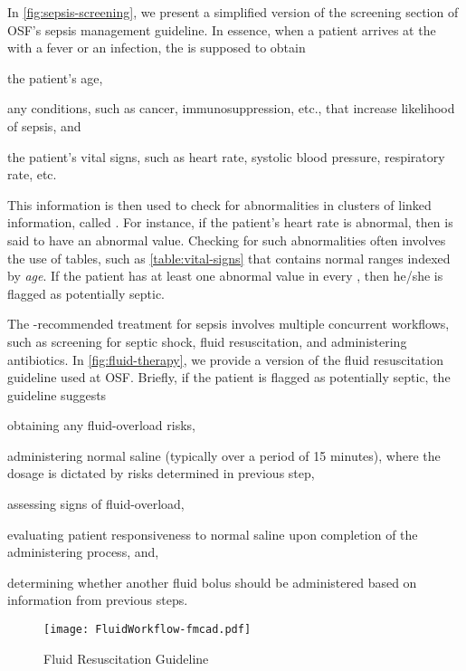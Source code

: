 In \autoref{fig:sepsis-screening}, we present a simplified version of
the screening section of OSF's sepsis management guideline.
In essence, when a patient arrives at the
\ED{} with a fever or an infection, the \HCP{} is supposed to obtain
\begin{enumerate*}[label=(\alph*)]
  \item the patient's age,
  \item any conditions, such as cancer, immunosuppression, etc.,
    that increase likelihood of sepsis, and
  \item the patient's vital signs, such as heart rate, systolic blood
    pressure, respiratory rate, etc.
\end{enumerate*}

This information is then used to check for abnormalities
in clusters of linked information, called . For instance, if
the patient's heart rate is abnormal, then  is said to
have an abnormal value.
Checking for such abnormalities often involves the use of tables, such as
\autoref{table:vital-signs} that contains normal ranges indexed by
\emph{age}.
If the patient has at least one abnormal value in every ,
then he/she is flagged as potentially septic.

The \BPG{}-recommended treatment for
sepsis involves multiple concurrent workflows, such as
screening for septic shock, fluid resuscitation, and administering antibiotics.
In \autoref{fig:fluid-therapy}, we provide
a version of the fluid resuscitation guideline used
at OSF. Briefly, if the patient is flagged as potentially septic, the guideline suggests
\begin{enumerate*}[label=(\roman*)]
  \item obtaining any fluid-overload risks,
  \item administering normal saline (typically over a period of 15 minutes),
    where the dosage is dictated by risks determined in previous step,
  \item assessing signs of fluid-overload,
  \item evaluating patient responsiveness to normal saline upon completion of
    the administering process, and,
  \item determining whether another fluid bolus should be administered based on
    information from previous steps.
\end{enumerate*}
\begin{figure}[h]
  \centering
  \texttt{[image: FluidWorkflow-fmcad.pdf]}
  \caption{Fluid Resuscitation Guideline}\label{fig:fluid-therapy}
\end{figure}

